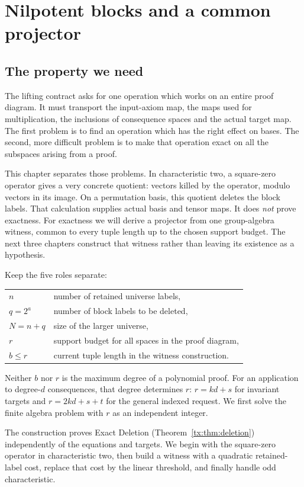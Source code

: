 \chapter{Nilpotent blocks and a common projector}\label{tx:sec:block-algebra}
\label{tx:ch:square-zero}
\section*{The property we need}
The lifting contract asks for one operation which works on an entire
proof diagram. It must transport the input-axiom map, the maps used for
multiplication, the inclusions of consequence spaces and the actual
target map. The first problem is to find an operation which has the
right effect on bases. The second, more difficult problem is to make
that operation exact on all the subspaces arising from a proof.

This chapter separates those problems. In characteristic two, a
square-zero operator gives a very concrete quotient: vectors killed
by the operator, modulo vectors in its image. On a permutation basis,
this quotient deletes the block labels. That calculation supplies
actual basis and tensor maps. It does \emph{not} prove exactness.
For exactness we will derive a projector from one group-algebra
witness, common to every tuple length up to the chosen support budget.
The next three chapters construct that witness rather than leaving
its existence as a hypothesis.

Keep the five roles separate:
\begin{center}
\begin{tabular}{@{}ll@{}}
$n$ & number of retained universe labels,\\
$q=2^a$ & number of block labels to be deleted,\\
$N=n+q$ & size of the larger universe,\\
$r$ & support budget for all spaces in the proof diagram,\\
$b\le r$ & current tuple length in the witness construction.
\end{tabular}
\end{center}
Neither $b$ nor $r$ is the maximum degree of a polynomial proof.
For an application to degree-$d$ consequences, that degree determines
$r$: $r=kd+s$ for invariant targets and $r=2kd+s+t$ for the general
indexed request. We first solve the finite algebra problem with $r$
as an independent integer.

The construction proves Exact Deletion
(Theorem~\ref{tx:thm:deletion}) independently of the equations and targets.
We begin with the square-zero operator in characteristic two,
then build a witness with a quadratic retained-label cost, replace that
cost by the linear threshold, and finally handle odd characteristic.

